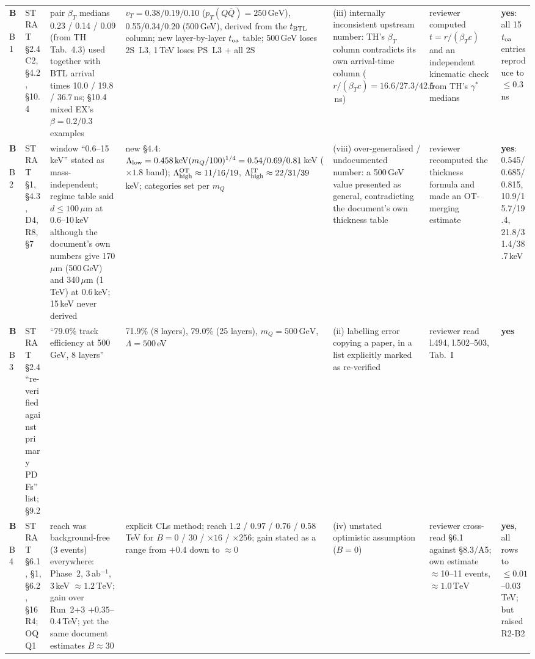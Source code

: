 \documentclass[11pt,a4paper]{article}
\newcommand{\mQ}{m_Q}
\newcommand{\GeV}{\,\mathrm{GeV}}
\newcommand{\TeV}{\,\mathrm{TeV}}
\newcommand{\keV}{\,\mathrm{keV}}
\newcommand{\pTQQ}{p_T(Q\bar Q)}
\newcommand{\um}{\,\mu\mathrm{m}}
\newcommand{\catB}{\textcolor{warn}{\textbf{B}}}
\begin{document}
\begin{landscape}
{\begin{longtable}{@{}L{1.0cm}L{2.5cm}L{4.6cm}L{4.6cm}L{3.6cm}L{3.6cm}L{2.6cm}@{}}
\catB{}\,B1 & STRAT \S2.4 C2, \S4.2, \S10.4 & pair $\beta_T$ medians 0.23 / 0.14 / 0.09 (from TH Tab.~4.3) used together with BTL arrival times 10.0 / 19.8 / 36.7\,ns; \S10.4 mixed EX's $\beta=0.2/0.3$ examples & $v_T=0.38/0.19/0.10$ ($\pTQQ=250\GeV$), 0.55/0.34/0.20 (500\,GeV), derived from the $t_{\rm BTL}$ column; new layer-by-layer $t_{\rm oa}$ table; 500\,GeV loses 2S~L3, 1\,TeV loses PS~L3 + all 2S & (iii) internally inconsistent upstream number: TH's $\beta_T$ column contradicts its own arrival-time column ($r/(\beta_Tc)=16.6/27.3/42.5$\,ns) & reviewer computed $t=r/(\beta_Tc)$ and an independent kinematic check from TH's $\gamma^*$ medians & \textbf{yes}: all 15 $t_{\rm oa}$ entries reproduce to $\leq0.3$\,ns\\
\catB{}\,B2 & STRAT \S1, \S4.3, D4, R8, \S7 & window ``0.6--15\,keV'' stated as mass-independent; regime table said $d\leq100\um$ at 0.6--10\,keV although the document's own numbers give 170\,$\mu$m (500\,GeV) and 340\,$\mu$m (1\,TeV) at 0.6\,keV; 15\,keV never derived & new \S4.4: $\Lambda_{\rm low}=0.458\keV(\mQ/100)^{1/4}=0.54/0.69/0.81$\,keV ($\times1.8$ band); $\Lambda_{\rm high}^{\rm OT}\approx11/16/19$, $\Lambda_{\rm high}^{\rm IT}\approx22/31/39$\,keV; categories set per $\mQ$ & (viii) over-generalised / undocumented number: a 500\,GeV value presented as general, contradicting the document's own thickness table & reviewer recomputed the thickness formula and made an OT-merging estimate & \textbf{yes}: 0.545/0.685/0.815, 10.9/15.7/19.4, 21.8/31.4/38.7\,keV\\
\catB{}\,B3 & STRAT \S2.4 ``re-verified against primary PDFs'' list; \S9.2 & ``79.0\% track efficiency at 500\,GeV, 8 layers'' & 71.9\% (8 layers), 79.0\% (25 layers), $\mQ=500\GeV$, $\Lambda=500$\,eV & (ii) labelling error copying a paper, in a list explicitly marked as re-verified & reviewer read \cite{Sha} l.494, l.502--503, Tab.~I & \textbf{yes}\\
\catB{}\,B4 & STRAT \S6.1, \S1, \S6.2, \S16 R4; OQ Q1 & reach was background-free (3 events) everywhere: Phase~2, 3\,ab$^{-1}$, 3\,keV $\approx1.2\TeV$; gain over Run~2+3 $+0.35$--0.4\,TeV; yet the same document estimates $B\approx30$ & explicit CLs method; reach 1.2 / 0.97 / 0.76 / 0.58\,TeV for $B=0$ / 30 / $\times16$ / $\times256$; gain stated as a range from $+0.4$ down to $\approx0$ & (iv) unstated optimistic assumption ($B=0$) & reviewer cross-read \S6.1 against \S8.3/A5; own estimate $\approx$10--11 events, $\approx1.0\TeV$ & \textbf{yes}, all rows to $\leq0.01$--0.03\,TeV; but raised R2-B2\\

\end{longtable}}
\end{landscape}
\end{document}
